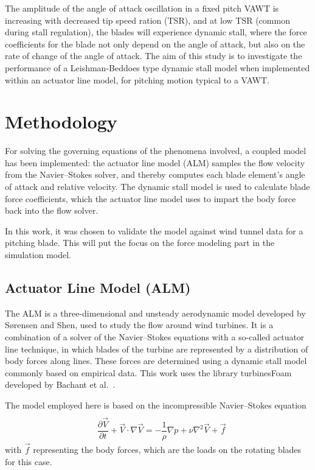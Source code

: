 \documentclass[a4paper]{jpconf}
\begin{document}
The amplitude of the angle of attack oscillation in a fixed pitch VAWT is
increasing with decreased tip speed ration (TSR), and at low TSR (common during
stall regulation), the blades will experience dynamic stall, where the force
coefficients for the blade not only depend on the angle of attack, but also on
the rate of change of the angle of attack. The aim of this study is to
investigate the performance of a Leishman-Beddoes type dynamic stall model when
implemented within an actuator line model, for pitching motion typical to a
VAWT.


\section{Methodology}

For solving the governing equations of the phenomena involved, a coupled model
has been implemented: the actuator line model (ALM) samples the flow velocity
from the Navier--Stokes solver, and thereby computes each blade element's angle
of attack and relative velocity. The dynamic stall model is used to calculate
blade force coefficients, which the actuator line model uses to impart the body
force back into the flow solver.

In this work, it was chosen to validate the model against wind tunnel data for a
pitching blade. This will put the focus on the force modeling part in the
simulation model.

\subsection{Actuator Line Model (ALM)}

The ALM is a three-dimensional and unsteady aerodynamic model developed by
S{\o}rensen and Shen\cite{sorensen1999computation}, used to study the flow
around wind turbines. It is a combination of a solver of the Navier--Stokes equations
with a so-called actuator line technique, in which blades of the turbine are
represented by a distribution of body forces along lines. These forces
are determined using a dynamic stall model commonly based on empirical data.
This work uses the library turbinesFoam developed by Bachant et
al.~\cite{bachant2015simulating,Bachant2016-VAT-ALM}.

The model employed here is based on the incompressible Navier--Stokes equation
\begin{align}
 & \nonumber \\ & \dfrac{\partial \vec{V}}{\partial t} + \vec{V} \cdot \nabla \vec{V} = - \dfrac{1}{ \rho} \nabla p + \nu \nabla ^2 \vec{V} + \vec{f}	  \label{eqmom}
\end{align} %
with $\vec{f}$ representing the body forces, which are the loads on the rotating blades for this case.
\end{document}
